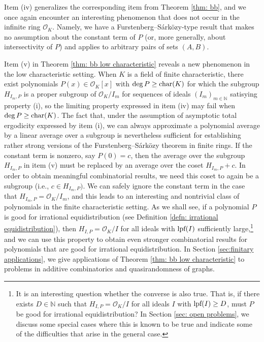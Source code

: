 \documentclass{amsart}
\theoremstyle{definition}
\numberwithin{equation}{section}
\newcommand{\N}{\mathbb{N}}
\newcommand{\mO}{\mathcal{O}}
\newcommand{\lpf}{\normalfont\text{lpf}}
\begin{document}
Item (iv) generalizes the corresponding item from Theorem \ref{thm: bb}, and we once again encounter an interesting phenomenon that does not occur in the infinite ring $\mO_K$.
Namely, we have a Furstenberg--S\'{a}rk\"{o}zy-type result that makes no assumption about the constant term of $P$ (or, more generally, about intersectivity of $P$) and applies to arbitrary pairs of sets $(A,B)$.

Item (v) in Theorem \ref{thm: bb low characteristic} reveals a new phenomenon in the low characteristic setting.
When $K$ is a field of finite characteristic, there exist polynomials $P(x) \in \mO_K[x]$ with $\deg{P} \ge \textup{char}(K)$ for which the subgroup $H_{I_m,P}$ is a proper subgroup of $\mO_K/I_m$ for sequences of ideals $(I_m)_{m \in \N}$ satisying property (i), so the limiting property expressed in item (iv) may fail when $\deg{P} \ge \textup{char}(K)$.
The fact that, under the assumption of asymptotic total ergodicity expressed by item (i), we can always approximate a polynomial average by a linear average over a subgroup is nevertheless sufficient for establishing rather strong versions of the Furstenberg--S\'{a}rk\"{o}zy theorem in finite rings.
If the constant term is nonzero, say $P(0) = c$, then the average over the subgroup $H_{I_m,P}$ in item (v) must be replaced by an average over the coset $H_{I_m,P} + c$. In order to obtain meaningful combinatorial results, we need this coset to again be a subgroup (i.e., $c \in H_{I_m,P})$.
We can safely ignore the constant term in the case that $H_{I_m,P} = \mO_K/I_m$, and this leads to an interesting and nontrivial class of polynomials in the finite characteristic setting.
As we shall see, if a polynomial $P$ is good for irrational equidistribution (see Definition \ref{defn: irrational equidistribution}), then $H_{I,P} = \mO_K/I$ for all ideals with $\lpf(I)$ sufficiently large,\footnote{It is an interesting question whether the converse is also true. That is, if there exists $D \in \N$ such that $H_{I,P} = \mO_K/I$ for all ideals $I$ with $\lpf(I) \ge D$, must $P$ be good for irrational equidistribution? In Section \ref{sec: open problems}, we discuss some special cases where this is known to be true and indicate some of the difficulties that arise in the general case.} and we can use this property to obtain even stronger combinatorial results for polynomials that are good for irrational equidistribution.
In Section \ref{sec:finitary applications}, we give applications of Theorem \ref{thm: bb low characteristic} to problems in additive combinatorics and quasirandomness of graphs. \\
\end{document}
